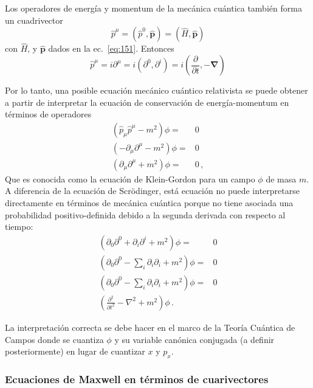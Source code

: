 \begin{frame}
Los operadores de energía y momentum de la mecánica cuántica también forma un cuadrivector
\begin{equation}
  \hat p^\mu=({\hat p}^0,\hat{\mathbf{p}})=(\widehat H,\hat{\mathbf{p}})
\end{equation}
con $\widehat H$, y $\hat{\mathbf{p}}$ dados en la ec.~\eqref{eq:151}. Entonces
\begin{equation}
  \label{eq:cv_hatpmu}
  \hat{p}^\mu=i\partial^\mu=i(\partial^0,\partial^i)=i(\frac{\partial}{\partial t},-\boldsymbol{\nabla})
\end{equation}

Por lo tanto, una posible ecuación mecánico cuántico relativista se puede obtener a partir de interpretar la ecuación de conservación de energía-momentum en términos de operadores
\begin{align}
  \label{eq:KG}
\left(\hat{p}_\mu  \hat{p}^\mu -m^2  \right)\phi=&0 \nonumber\\
  \left(-\partial_{\mu}\partial^{\mu} -m^2  \right)\phi=&0 \nonumber\\
  \left(\partial_{\mu}\partial^{\mu} +m^2  \right)\phi=&0 \,,
\end{align}
Que es conocida como la ecuación de Klein-Gordon para un campo $\phi$ de masa $m$. A diferencia de la ecuación de Scrödinger, está ecuación no puede interpretarse directamente en términos de mecánica cuántica porque no tiene asociada una probabilidad positivo-definida debido a la segunda derivada con respecto al tiempo:
\begin{align}
  \left(\partial_0\partial^0+\partial_i\partial^i +m^2  \right)\phi=&0 \nonumber\\
  \left(\partial_0\partial^0-\sum_i\partial_i\partial_i +m^2  \right)\phi=&0 \nonumber\\
  \left(\partial_0\partial^0-\sum_i\partial_i\partial_i +m^2  \right)\phi=&0 \nonumber\\
\left(   \frac{\partial^2}{\partial t^2}-\nabla^2+m^2  \right)\phi\,.
\end{align}

La interpretación correcta se debe hacer en el marco de la Teoría Cuántica de Campos donde se cuantiza $\phi$ y su variable canónica conjugada (a definir posteriormente) en lugar de cuantizar $x$ y $p_x$.
\end{frame}



\subsubsection{Ecuaciones de Maxwell en términos de cuarivectores}


